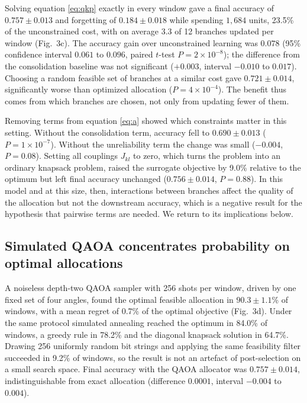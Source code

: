 \documentclass[12pt,a4paper]{article}
\begin{document}
Solving equation \eqref{eq:qkp} exactly in every window gave a final accuracy of $0.757\pm0.013$ and forgetting of $0.184\pm0.018$ while spending $1{,}684$ units, 23.5\% of the unconstrained cost, with on average 3.3 of 12 branches updated per window (Fig.~3c). The accuracy gain over unconstrained learning was $0.078$ (95\% confidence interval $0.061$ to $0.096$, paired $t$-test $P=2\times10^{-8}$); the difference from the consolidation baseline was not significant ($+0.003$, interval $-0.010$ to $0.017$). Choosing a random feasible set of branches at a similar cost gave $0.721\pm0.014$, significantly worse than optimized allocation ($P=4\times10^{-4}$). The benefit thus comes from which branches are chosen, not only from updating fewer of them.

Removing terms from equation \eqref{eq:a} showed which constraints matter in this setting. Without the consolidation term, accuracy fell to $0.690\pm0.013$ ($P=1\times10^{-7}$). Without the unreliability term the change was small ($-0.004$, $P=0.08$). Setting all couplings $J_{kl}$ to zero, which turns the problem into an ordinary knapsack problem, raised the surrogate objective by 9.0\% relative to the optimum but left final accuracy unchanged ($0.756\pm0.014$, $P=0.88$). In this model and at this size, then, interactions between branches affect the quality of the allocation but not the downstream accuracy, which is a negative result for the hypothesis that pairwise terms are needed. We return to its implications below.

\subsection*{Simulated QAOA concentrates probability on optimal allocations}

A noiseless depth-two QAOA sampler with 256 shots per window, driven by one fixed set of four angles, found the optimal feasible allocation in $90.3\pm1.1$\% of windows, with a mean regret of 0.7\% of the optimal objective (Fig.~3d). Under the same protocol simulated annealing reached the optimum in 84.0\% of windows, a greedy rule in 78.2\% and the diagonal knapsack solution in 64.7\%. Drawing 256 uniformly random bit strings and applying the same feasibility filter succeeded in 9.2\% of windows, so the result is not an artefact of post-selection on a small search space. Final accuracy with the QAOA allocator was $0.757\pm0.014$, indistinguishable from exact allocation (difference $0.0001$, interval $-0.004$ to $0.004$).
\end{document}
